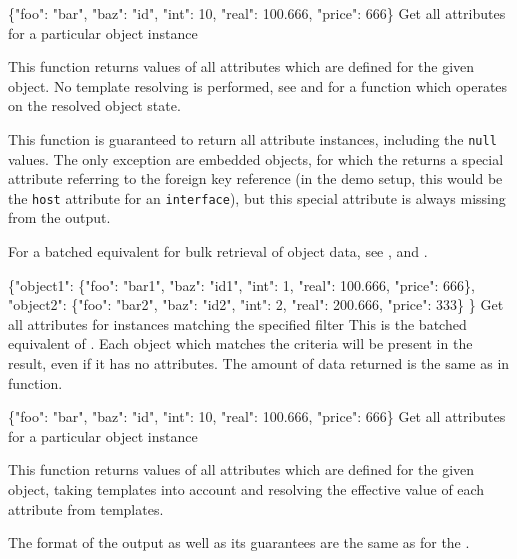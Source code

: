 \documentclass{article}
\begin{document}
    {\{"foo": "bar", "baz": "id", "int": 10, "real": 100.666, "price": 666\}}
    {Get all attributes for a particular object instance}
    {This function returns values of all attributes which are defined for the given object.  No template resolving is
    performed, see  and  for a function
    which operates on the resolved object state.

    This function is guaranteed to return all attribute instances, including the {\tt null} values.  The only exception are
    embedded objects, for which the  returns a special attribute referring to the foreign
    key reference (in the demo setup, this would be the {\tt host} attribute for an {\tt interface}), but this special
    attribute is always missing from the  output.

    For a batched equivalent for bulk retrieval of object data, see ,
     and .

    \deskaUnsortedRes
    }

    {\{"object1": \{"foo": "bar1", "baz": "id1", "int": 1, "real": 100.666, "price": 666\}, \\
       "object2": \{"foo": "bar2", "baz": "id2", "int": 2, "real": 200.666, "price": 333\}
      \}}
    {Get all attributes for instances matching the specified filter}
    {This is the batched equivalent of .  Each object which matches the criteria will be
    present in the result, even if it has no attributes.  The amount of data returned is the same as in
     function.  \deskaUnsortedRes}

    {\{"foo": "bar", "baz": "id", "int": 10, "real": 100.666, "price": 666\}}
    {Get all attributes for a particular object instance}
    {This function returns values of all attributes which are defined for the given object, taking templates into
    account and resolving the effective value of each attribute from templates.

    The format of the output as well as its guarantees are the same as for the .

    \deskaUnsortedRes
    }
\end{document}
